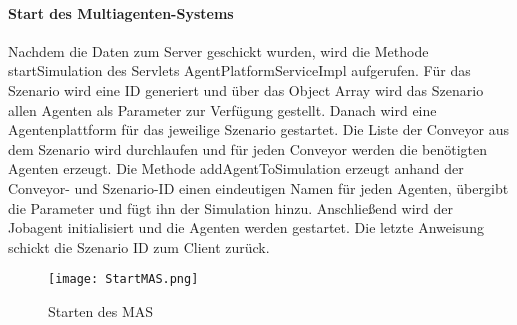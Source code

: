 \paragraph{Start des Multiagenten-Systems}
Nachdem die Daten zum Server geschickt wurden, wird die Methode startSimulation des Servlets AgentPlatformServiceImpl aufgerufen. Für das Szenario wird eine ID generiert und über das Object Array wird das Szenario allen Agenten als Parameter zur Verfügung gestellt. Danach wird eine Agentenplattform für das jeweilige Szenario gestartet. Die Liste der Conveyor aus dem Szenario wird durchlaufen und für jeden Conveyor werden die benötigten Agenten erzeugt. Die Methode addAgentToSimulation erzeugt anhand der Conveyor- und Szenario-ID einen eindeutigen Namen für jeden Agenten, übergibt die Parameter und fügt ihn der Simulation hinzu. Anschließend wird der Jobagent initialisiert und die Agenten werden gestartet. Die letzte Anweisung schickt die Szenario ID zum Client zurück.  
\begin{figure}[h!]
	\centering
		\texttt{[image: StartMAS.png]}        
		\caption{Starten des MAS}
	\label{SMAS}
\end{figure}

